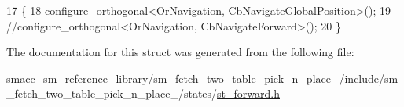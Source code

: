 \begin{DoxyCode}
17     \{
18       configure\_orthogonal<OrNavigation, CbNavigateGlobalPosition>();
19       \textcolor{comment}{//configure\_orthogonal<OrNavigation, CbNavigateForward>();}
20     \}
\end{DoxyCode}


The documentation for this struct was generated from the following file\+:\begin{DoxyCompactItemize}
\item 
smacc\+\_\+sm\+\_\+reference\+\_\+library/sm\+\_\+fetch\+\_\+two\+\_\+table\+\_\+pick\+\_\+n\+\_\+place\+\_/include/sm\+\_\+fetch\+\_\+two\+\_\+table\+\_\+pick\+\_\+n\+\_\+place\+\_/states/\hyperlink{st__forward_8h}{st\+\_\+forward.\+h}\end{DoxyCompactItemize}
